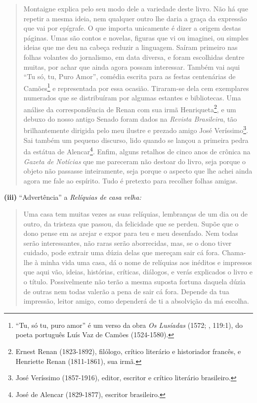 \begin{quote}
Montaigne explica pelo seu modo dele a variedade deste livro. Não há que
repetir a mesma ideia, nem qualquer outro lhe daria a graça da expressão
que vai por epígrafe. O que importa unicamente é dizer a origem destas
páginas. Umas são contos e novelas, figuras que vi ou imaginei, ou
simples ideias que me deu na cabeça reduzir a linguagem. Saíram primeiro
nas folhas volantes do jornalismo, em data diversa, e foram escolhidas
dentre muitas, por achar que ainda agora possam interessar. Também vai
aqui ``Tu só, tu, Puro Amor'', comédia escrita para as festas
centenárias de Camões\footnote{``Tu, só tu, puro amor'' é um verso da
  obra \emph{Os Lusíadas} (1572; , 119:1), do poeta português Luís
  Vaz de Camões (1524-1580).} e representada por essa ocasião.
Tiraram-se dela cem exemplares numerados que se distribuíram por algumas
estantes e bibliotecas. Uma análise da correspondência de Renan com sua
irmã Henriqueta\footnote{Ernest Renan (1823-1892), filólogo, crítico
  literário e historiador francês, e Henriette Renan (1811-1861), sua
  irmã.}, e um debuxo do nosso antigo Senado foram dados na
\emph{Revista Brasileira}, tão brilhantemente dirigida pelo meu ilustre
e prezado amigo José Veríssimo\footnote{José Veríssimo (1857-1916),
  editor, escritor e crítico literário brasileiro.}. Sai também um
pequeno discurso, lido quando se lançou a primeira pedra da estátua de
Alencar\footnote{José de Alencar (1829-1877), escritor brasileiro.}.
Enfim, alguns retalhos de cinco anos de crônica na \emph{Gazeta de
Notícias} que me pareceram não destoar do livro, seja porque o objeto
não passasse inteiramente, seja porque o aspecto que lhe achei ainda
agora me fale ao espírito. Tudo é pretexto para recolher folhas amigas.
\end{quote}

\textbf{(iii)} ``Advertência'' a \emph{Relíquias de casa velha: }

\begin{quote}
Uma casa tem muitas vezes as suas relíquias, lembranças de um dia ou de
outro, da tristeza que passou, da felicidade que se perdeu. Supõe que o
dono pense em as arejar e expor para teu e meu desenfado. Nem todas
serão interessantes, não raras serão aborrecidas, mas, se o dono tiver
cuidado, pode extrair uma dúzia delas que mereçam sair cá fora.
Chama-lhe à minha vida uma casa, dá o nome de relíquias aos inéditos e
impressos que aqui vão, ideias, histórias, críticas, diálogos, e verás
explicados o livro e o título. Possivelmente não terão a mesma suposta
fortuna daquela dúzia de outras nem todas valerão a pena de sair cá
fora. Depende da tua impressão, leitor amigo, como dependerá de ti a
absolvição da má escolha.
\end{quote}